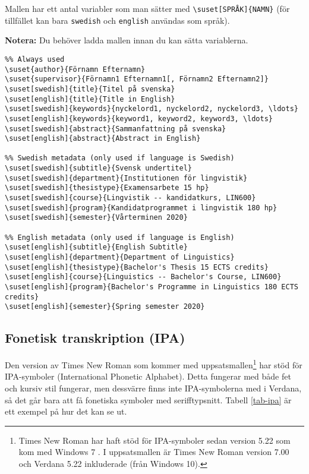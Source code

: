 Mallen har ett antal variabler som man sätter med \verb|\suset[SPRÅK]{NAMN}|
(för tillfället kan bara \texttt{swedish} och \texttt{english} användas som
språk).

\textbf{Notera:} Du behöver ladda mallen innan du kan sätta variablerna.

\begin{verbatim}
%% Always used
\suset{author}{Förnamn Efternamn}
\suset{supervisor}{Förnamn1 Efternamn1[, Förnamn2 Efternamn2]}
\suset[swedish]{title}{Titel på svenska}
\suset[english]{title}{Title in English}
\suset[swedish]{keywords}{nyckelord1, nyckelord2, nyckelord3, \ldots}
\suset[english]{keywords}{keyword1, keyword2, keyword3, \ldots}
\suset[swedish]{abstract}{Sammanfattning på svenska}
\suset[english]{abstract}{Abstract in English}

%% Swedish metadata (only used if language is Swedish)
\suset[swedish]{subtitle}{Svensk undertitel}
\suset[swedish]{department}{Institutionen för lingvistik}
\suset[swedish]{thesistype}{Examensarbete 15 hp}
\suset[swedish]{course}{Lingvistik -- kandidatkurs, LIN600}
\suset[swedish]{program}{Kandidatprogrammet i lingvistik 180 hp}
\suset[swedish]{semester}{Vårterminen 2020}

%% English metadata (only used if language is English)
\suset[english]{subtitle}{English Subtitle}
\suset[english]{department}{Department of Linguistics}
\suset[english]{thesistype}{Bachelor's Thesis 15 ECTS credits}
\suset[english]{course}{Linguistics -- Bachelor's Course, LIN600}
\suset[english]{program}{Bachelor's Programme in Linguistics 180 ECTS credits}
\suset[english]{semester}{Spring semester 2020}
\end{verbatim}


\subsection{Fonetisk transkription (IPA)}
\label{ipa}

Den version av Times New Roman som kommer med uppsatsmallen\footnote{Times New
  Roman har haft stöd för IPA-symboler sedan version 5.22 \citep{ipa} som kom
  med Windows 7 \citep{win-7-fonts}. I uppsatsmallen är Times New Roman version
  7.00 och Verdana 5.22 inkluderade (från Windows 10).} har stöd för
IPA-symboler (International Phonetic Alphabet). Detta fungerar med både fet och
kursiv stil fungerar, men dessvärre finns inte IPA-symbolerna med i Verdana, så
det går bara att få fonetiska symboler med serifftypsnitt. Tabell
\ref{tab-ipa} är ett exempel på hur det kan se ut.

